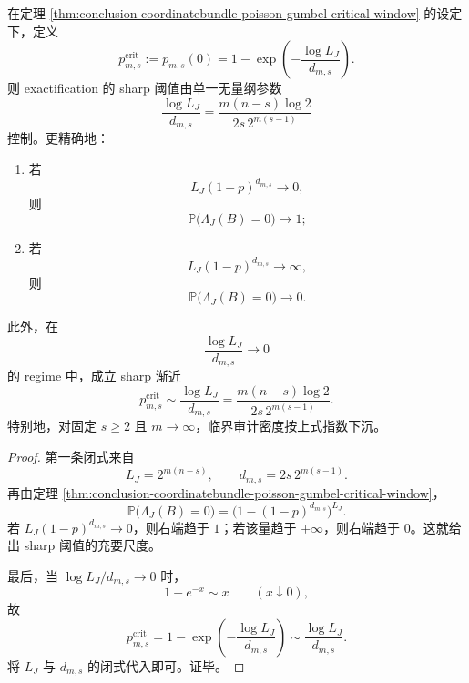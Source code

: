 \begin{corollary}\label{cor:conclusion-coordinatebundle-critical-audit-density}
在定理 \ref{thm:conclusion-coordinatebundle-poisson-gumbel-critical-window} 的设定下，定义
\[
p_{m,s}^{\mathrm{crit}}:=p_{m,s}(0)=1-\exp\!\left(-\frac{\log L_J}{d_{m,s}}\right).
\]
则 exactification 的 sharp 阈值由单一无量纲参数
\[
\frac{\log L_J}{d_{m,s}}
=
\frac{m(n-s)\log 2}{2s\,2^{m(s-1)}}
\]
控制。更精确地：
\begin{enumerate}
  \item 若
  \[
  L_J(1-p)^{d_{m,s}}\to 0,
  \]
  则
  \[
  \mathbb P\bigl(\Lambda_J(B)=0\bigr)\to 1;
  \]
  \item 若
  \[
  L_J(1-p)^{d_{m,s}}\to\infty,
  \]
  则
  \[
  \mathbb P\bigl(\Lambda_J(B)=0\bigr)\to 0.
  \]
\end{enumerate}
此外，在
\[
\frac{\log L_J}{d_{m,s}}\to 0
\]
的 regime 中，成立 sharp 渐近
\[
p_{m,s}^{\mathrm{crit}}
\sim
\frac{\log L_J}{d_{m,s}}
=
\frac{m(n-s)\log 2}{2s\,2^{m(s-1)}}.
\]
特别地，对固定 \(s\ge 2\) 且 \(m\to\infty\)，临界审计密度按上式指数下沉。
\end{corollary}
\begin{proof}
第一条闭式来自
\[
L_J=2^{m(n-s)},
\qquad
d_{m,s}=2s\,2^{m(s-1)}.
\]
再由定理 \ref{thm:conclusion-coordinatebundle-poisson-gumbel-critical-window}，
\[
\mathbb P\bigl(\Lambda_J(B)=0\bigr)
=
\bigl(1-(1-p)^{d_{m,s}}\bigr)^{L_J}.
\]
若 \(L_J(1-p)^{d_{m,s}}\to 0\)，则右端趋于 \(1\)；若该量趋于 \(+\infty\)，则右端趋于 \(0\)。这就给出 sharp 阈值的充要尺度。

最后，当 \(\log L_J/d_{m,s}\to 0\) 时，
\[
1-e^{-x}\sim x
\qquad
(x\downarrow 0),
\]
故
\[
p_{m,s}^{\mathrm{crit}}
=
1-\exp\!\left(-\frac{\log L_J}{d_{m,s}}\right)
\sim
\frac{\log L_J}{d_{m,s}}.
\]
将 \(L_J\) 与 \(d_{m,s}\) 的闭式代入即可。证毕。
\end{proof}

